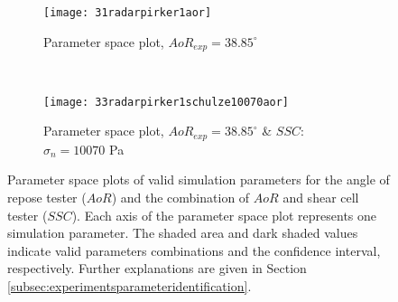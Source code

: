 \documentclass{llncs}
\begin{document}
\begin{figure}[htp] \centering
    \begin{subfigure}[b]{0.96\columnwidth}
        \texttt{[image: 31radarpirker1aor]}
        \caption{Parameter space plot, $AoR_{exp} = 38.85 ^\circ$}
        \label{fig:31radarpirker1aor} 
    \end{subfigure}\\
        \begin{subfigure}[b]{0.96\columnwidth}
        \texttt{[image: 33radarpirker1schulze10070aor]}
        \caption{Parameter space plot, $AoR_{exp} = 38.85
        ^\circ$ \& $SSC$: $\sigma_n=10070$ Pa}
        \label{fig:33radarpirker1schulze10070aor} 
    \end{subfigure}
    \caption[Parameter space plots of valid simulation parameters for the AoR
    and the combination of AoR and SSC valid parameters]{Parameter space plots
    of valid simulation parameters for the angle of repose tester ($AoR$) and the
    combination of $AoR$ and shear cell tester ($SSC$).
    Each axis of the parameter space plot represents one simulation parameter.
    The shaded area 
    and dark shaded values indicate
    valid parameters combinations and
    the confidence interval, respectively.
    Further explanations are given in Section
    \ref{subsec:experimentsparameteridentification}.}
    \label{fig:35schulze10070aorradarandcloud}
\end{figure}
\end{document}
